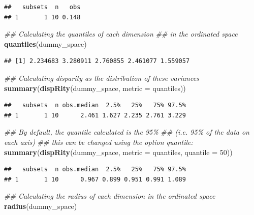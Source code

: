 \documentclass[
]{book}
\newenvironment{Shaded}{\begin{snugshade}}{\end{snugshade}}
\newcommand{\CommentTok}[1]{\textcolor[rgb]{0.56,0.35,0.01}{\textit{#1}}}
\newcommand{\DataTypeTok}[1]{\textcolor[rgb]{0.13,0.29,0.53}{#1}}
\newcommand{\DecValTok}[1]{\textcolor[rgb]{0.00,0.00,0.81}{#1}}
\newcommand{\KeywordTok}[1]{\textcolor[rgb]{0.13,0.29,0.53}{\textbf{#1}}}
\newcommand{\NormalTok}[1]{#1}
\begin{document}
\begin{verbatim}
##   subsets  n   obs
## 1       1 10 0.148
\end{verbatim}

\begin{Shaded}
\begin{Highlighting}[]
\CommentTok{\#\# Calculating the quantiles of each dimension}
\CommentTok{\#\# in the ordinated space}
\KeywordTok{quantiles}\NormalTok{(dummy\_space)}
\end{Highlighting}
\end{Shaded}

\begin{verbatim}
## [1] 2.234683 3.280911 2.760855 2.461077 1.559057
\end{verbatim}

\begin{Shaded}
\begin{Highlighting}[]
\CommentTok{\#\# Calculating disparity as the distribution of these variances}
\KeywordTok{summary}\NormalTok{(}\KeywordTok{dispRity}\NormalTok{(dummy\_space, }\DataTypeTok{metric =}\NormalTok{ quantiles))}
\end{Highlighting}
\end{Shaded}

\begin{verbatim}
##   subsets  n obs.median  2.5%   25%   75% 97.5%
## 1       1 10      2.461 1.627 2.235 2.761 3.229
\end{verbatim}

\begin{Shaded}
\begin{Highlighting}[]
\CommentTok{\#\# By default, the quantile calculated is the 95\%}
\CommentTok{\#\# (i.e. 95\% of the data on each axis)}
\CommentTok{\#\# this can be changed using the option quantile:}
\KeywordTok{summary}\NormalTok{(}\KeywordTok{dispRity}\NormalTok{(dummy\_space, }\DataTypeTok{metric =}\NormalTok{ quantiles, }\DataTypeTok{quantile =} \DecValTok{50}\NormalTok{))}
\end{Highlighting}
\end{Shaded}

\begin{verbatim}
##   subsets  n obs.median  2.5%   25%   75% 97.5%
## 1       1 10      0.967 0.899 0.951 0.991 1.089
\end{verbatim}

\begin{Shaded}
\begin{Highlighting}[]
\CommentTok{\#\# Calculating the radius of each dimension in the ordinated space}
\KeywordTok{radius}\NormalTok{(dummy\_space)}
\end{Highlighting}
\end{Shaded}
\end{document}
